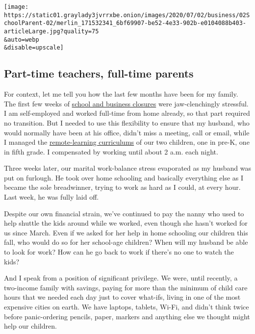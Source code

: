 \texttt{[image: https://static01.graylady3jvrrxbe.onion/images/2020/07/02/business/02SchoolParent-02/merlin\_171532341\_6bf69907-be52-4e33-902b-e0104088b403-articleLarge.jpg?quality=75\\\&auto=webp\\\&disable=upscale]}

\hypertarget{part-time-teachers-full-time-parents}{%
\subsection{Part-time teachers, full-time
parents}\label{part-time-teachers-full-time-parents}}

For context, let me tell you how the last few months have been for my
family. The first few weeks of
\href{https://www.nytimes3xbfgragh.onion/2020/05/01/nyregion/coronavirus-new-york-update.html}{school
and business closures} were jaw-clenchingly stressful. I am
self-employed and worked full-time from home already, so that part
required no transition. But I needed to use this flexibility to ensure
that my husband, who would normally have been at his office, didn't miss
a meeting, call or email, while I managed the
\href{https://www.nytimes3xbfgragh.onion/2020/06/13/health/school-learning-online-education.html}{remote-learning
curriculums} of our two children, one in pre-K, one in fifth grade. I
compensated by working until about 2 a.m. each night.

Three weeks later, our marital work-balance stress evaporated as my
husband was put on furlough. He took over home schooling and basically
everything else as I became the sole breadwinner, trying to work as hard
as I could, at every hour. Last week, he was fully laid off.

Despite our own financial strain, we've continued to pay the nanny who
used to help shuttle the kids around while we worked, even though she
hasn't worked for us since March. Even if we asked for her help in home
schooling our children this fall, who would do so for her school-age
children? When will my husband be able to look for work? How can he go
back to work if there's no one to watch the kids?

And I speak from a position of significant privilege. We were, until
recently, a two-income family with savings, paying for more than the
minimum of child care hours that we needed each day just to cover
what-ifs, living in one of the most expensive cities on earth. We have
laptops, tablets, Wi-Fi, and didn't think twice before panic-ordering
pencils, paper, markers and anything else we thought might help our
children.

